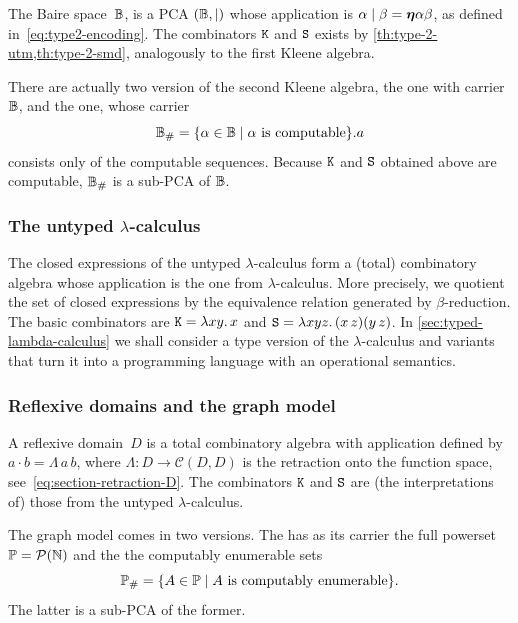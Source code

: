 The Baire space~$\mathbb{B}$, is a PCA $(\mathbb{B}, {\mid})$ whose application is $\alpha \mid \beta = \text{\boldmath{$\eta$}}{\alpha}{\beta}$, as defined in~\eqref{eq:type2-encoding}. The combinators $\mathtt{K}$ and $\mathtt{S}$ exists by \cref{th:type-2-utm,th:type-2-smd}, analogously to the first Kleene algebra.

There are actually two version of the second Kleene algebra, the  one
with carrier~$\mathbb{B}$, and the  one, whose carrier
%
\begin{equation*}
  \mathbb{B}_{\#} = \{\alpha \in \mathbb{B} \mid \text{$\alpha$ is computable}\}.a
\end{equation*}
%
consists only of the computable sequences. Because $\mathtt{K}$ and $\mathtt{S}$ obtained above are computable, $\mathbb{B}_{\#}$ is a sub-PCA of $\mathbb{B}$.


\subsubsection{The untyped $\lambda$-calculus}

The closed expressions of the untyped $\lambda$-calculus form a
(total) combinatory algebra whose application is the one from
$\lambda$-calculus. More precisely, we quotient the set of closed
expressions by the equivalence relation generated by
$\beta$-reduction. The basic combinators are $\mathtt{K} = \lambda x y .\,x$
and $\mathtt{S} = \lambda x y z .\,(x \, z)(y \, z)$.
%
In \cref{sec:typed-lambda-calculus} we shall consider a type version of the $\lambda$-calculus and variants that turn it into a programming language with an operational semantics.


\subsubsection{Reflexive domains and the graph model}

A reflexive domain~$D$ is a total combinatory algebra with application defined by $a \cdot b = \Lambda \, a \, b$, where $\Lambda : D \to \mathcal{C}(D, D)$ is the
retraction onto the function space, see~\eqref{eq:section-retraction-D}. The combinators $\mathtt{K}$ and $\mathtt{S}$ are (the interpretations of) those from the untyped $\lambda$-calculus.

The graph model comes in two versions. The  has as its carrier the full powerset $\mathbb{P} = \mathcal{P}(\mathbb{N})$ and the  the computably enumerable sets
%
\begin{equation*}
  \mathbb{P}_{\#} = \{ A \in \mathbb{P} \mid \text{$A$ is computably enumerable} \}.
\end{equation*}
%
The latter is a sub-PCA of the former.


